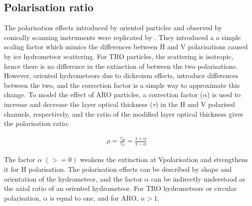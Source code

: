 \documentclass[amt, manuscript]{copernicus}
\begin{document}
\subsection{Polarisation ratio}
\label{sec:polratio}

The polarisation effects introduced by oriented particles and observed by conically scanning instruments \citep{gong:micro:17} were replicated by \citet{barlakas:intro:21}. They introduced a a simple scaling factor which mimics the differences between H and V polarisations caused by ice hydrometeor scattering. For TRO particles, the scattering is isotropic, hence there is no difference in the extinction of between the two polarisations. However, oriented hydrometeors due to dichroism effects, introduce differences between the two, and the correction factor is a simple way to approximate this change. To model the effect of ARO particles, a correction factor ($\alpha$) is used to increase and decrease the layer optical thickness ($\tau$) in the H and V
polarised channels, respectively, and the ratio of the modified layer optical thickness gives the polarisation ratio:

\begin{eqnarray}
\rho = \frac{\tau_H}{\tau_V} = \frac{1+\alpha}{1-\alpha}
\end{eqnarray}

The factor $\alpha$ $(>= 0)$  weakens the extinction at Vpolarisation and strengthens it for H polarisation. The polarisation effects can be described by shape and orientation of the hydrometeor, and the factor $\alpha$ can be indirectly understood as the axial ratio of an oriented hydrometeor. For TRO hydrometeors or circular polarisation, $\alpha$ is equal to one, and for ARO, $\alpha > 1$. 
\end{document}
